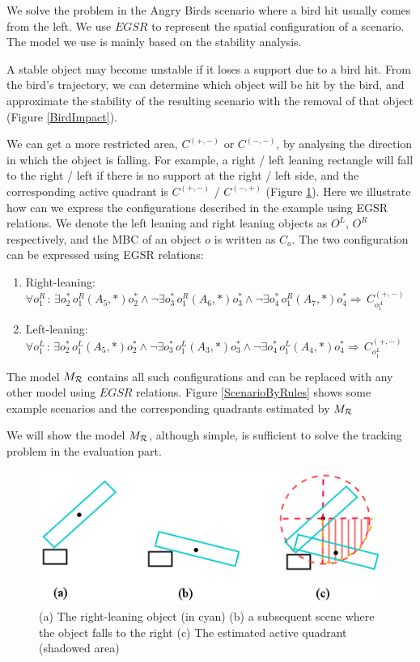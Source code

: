 \documentclass[letterpaper]{article}
\begin{document}
We solve the problem in the Angry Birds scenario where a bird hit usually comes from the left. We use $EGSR$ to represent the spatial configuration of a scenario. The model we use is mainly based on the stability analysis.


A stable object may become unstable if it loses a support due to a bird hit. From the bird's trajectory, we can determine which object will be hit by the bird, and approximate the stability of the resulting scenario with the removal of that object (Figure \ref{BirdImpact}). 

We can get a more restricted area, $C^{(+,-)}$ or $C^{(-,-)}$, by analysing the direction in which the object is falling. For example, a right / left leaning rectangle will fall to the right / left if there is no support at the right / left side, and the corresponding active quadrant is $C^{(+,-)}$ / $C^{(-, +)}$ (Figure \ref{QudrantsEstimation}). Here we illustrate how can we express the configurations described in the example using EGSR relations. We denote the left leaning and right leaning objects as $O^L$, $O^R$ respectively, and the MBC of an object $o$ is written as $C_{o}$. The two configuration can be expressed using EGSR relations:
\begin{enumerate}
\item Right-leaning: $\forall o^R_1\,:\, \exists o^*_2\,o^R_1 (A_5, *) o^*_2 \wedge\neg\exists o^*_3\,o^R_1 (A_6, *) o^*_3 \wedge\neg\exists o^*_4\,o^R_1 (A_7, *) o^*_4 \Rightarrow \, C_{o^A_1}^{(+,-)}$

\item Left-leaning: $\forall o^L_1\,:\, \exists o^*_2\,o^L_1 (A_5, *) o^*_2 \wedge\neg\exists o^*_3\,o^L_1 (A_3, *) o^*_3 \wedge\neg\exists o^*_4\,o^L_1 (A_4, *) o^*_4 \Rightarrow \, C_{o^L_1}^{(+,-)}$
\end{enumerate}
The model $M_{\cal{R}}$ contains all such configurations and can be replaced with any other model using $EGSR$ relations. Figure \ref{ScenarioByRules} shows some example scenarios and the corresponding quadrants estimated by $M_{\cal{R}}$

 We will show the model $M_{\cal{R}}$, although simple, is sufficient to solve the tracking problem in the evaluation part.  


\begin{figure}[h!]
\centering\includegraphics[scale=0.35]{QudrantsEstimation.png}\caption{(a) The right-leaning object (in cyan)  (b) a subsequent scene where the object falls to the right (c) The estimated active quadrant (shadowed area)}
\label{QudrantsEstimation}
\end{figure}
\end{document}
